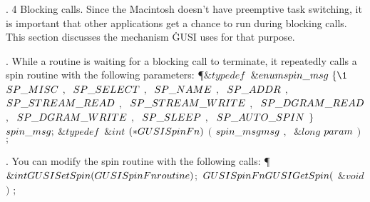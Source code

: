 \fi

. 4 Blocking calls. Since the Macintosh doesn't have preemptive task
switching, it
is important that other applications get a chance to run during blocking calls.
This
section discusses the mechanism \.{GUSI} uses for that purpose.

\fi

. While a routine is waiting for a blocking call to terminate, it
repeatedly calls a
spin routine with the following parameters:
\Y\P $\&{typedef}\ $ $\&{enum}\ \\{spin\_msg}\ \{\1$ $\\{SP\_MISC}$ $,\;$\5
\6
$\\{SP\_SELECT}$ $,\;$\5
\6
$\\{SP\_NAME}$ $,\;$\5
\6
$\\{SP\_ADDR}$ $,\;$\5
\6
$\\{SP\_STREAM\_READ}$ $,\;$\5
\6
$\\{SP\_STREAM\_WRITE}$ $,\;$\5
\6
$\\{SP\_DGRAM\_READ}$ $,\;$\5
\6
$\\{SP\_DGRAM\_WRITE}$ $,\;$\5
\6
$\\{SP\_SLEEP}$ $,\;$\5
\6
$\\{SP\_AUTO\_SPIN}$\5
\6
$\}$ $\\{spin\_msg};$\7
$\&{typedef}\ $ $\&{int}$ $({{*}}\\{GUSISpinFn})$ $($ $\\{spin\_msg}\ \\{msg}$
$,\;$ $\&{long}$ $\\{param}$ $)$ $;$\par
\fi

. You can modify the spin routine with the following calls:
\Y\P $\&{int}\ \\{GUSISetSpin}(\\{GUSISpinFn}\ \\{routine})$\1$;$\2\7
$\\{GUSISpinFn}\ \\{GUSIGetSpin}($ $\&{void}$ $)$ $;$\par
\fi

